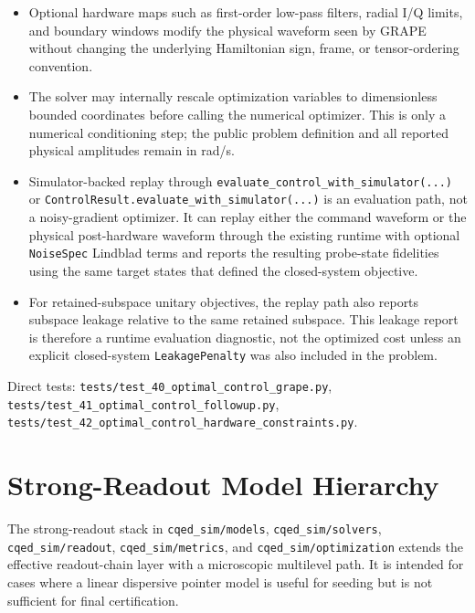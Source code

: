 \documentclass[11pt]{article}
\begin{document}
\begin{itemize}[leftmargin=1.5em]
  a reduced-state or isometry task into a full-space unitary objective.
  \item Optional hardware maps such as first-order low-pass filters, radial I/Q
  limits, and boundary windows modify the physical waveform seen by GRAPE without
  changing the underlying Hamiltonian sign, frame, or tensor-ordering convention.
  \item The solver may internally rescale optimization variables to dimensionless
  bounded coordinates before calling the numerical optimizer. This is only a
  numerical conditioning step; the public problem definition and all reported
  physical amplitudes remain in rad/s.
  \item Simulator-backed replay through
  \texttt{evaluate\_control\_with\_simulator(...)} or
  \texttt{ControlResult.evaluate\_with\_simulator(...)} is an evaluation path,
  not a noisy-gradient optimizer. It can replay either the command waveform or
  the physical post-hardware waveform through the existing runtime with optional
  \texttt{NoiseSpec} Lindblad terms and reports the resulting probe-state
  fidelities using the same target states that defined the closed-system
  objective.
  \item For retained-subspace unitary objectives, the replay path also reports
  subspace leakage relative to the same retained subspace. This leakage report is
  therefore a runtime evaluation diagnostic, not the optimized cost unless an
  explicit closed-system \texttt{LeakagePenalty} was also included in the problem.
\end{itemize}

\noindent
Direct tests:
\texttt{tests/test\_40\_optimal\_control\_grape.py},
\texttt{tests/test\_41\_optimal\_control\_followup.py},
\texttt{tests/test\_42\_optimal\_control\_hardware\_constraints.py}.

\section{Strong-Readout Model Hierarchy}
The strong-readout stack in \texttt{cqed\_sim/models},
\texttt{cqed\_sim/solvers}, \texttt{cqed\_sim/readout},
\texttt{cqed\_sim/metrics}, and \texttt{cqed\_sim/optimization} extends the
effective readout-chain layer with a microscopic multilevel path. It is intended
for cases where a linear dispersive pointer model is useful for seeding but is
not sufficient for final certification.
\end{document}

